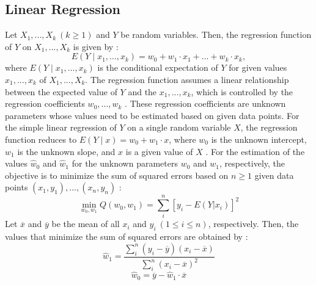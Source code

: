 \subsection{Linear Regression}
Let $X_1, ..., X_k \ (k \geq 1)$ and $Y$ be random variables. Then, the regression function of $Y$ on $X_1, ..., X_k$ is given by \cite{Standardization}:
\begin{equation}
E(Y \mid x_1, ..., x_k) = w_0 + w_1 \cdot x_1 + ... + w_k \cdot x_k,
\label{eq:regression_function}
\end{equation}
where $E(Y \mid x_1, ..., x_k)$ is the conditional expectation of $Y$ for given values $x_1, ..., x_k$ of $X_1, ..., X_k$. The regression function assumes a linear relationship between the expected value of $Y$ and the $x_1, ..., x_k$, which is controlled by the regression coefficients $w_0, ..., w_k$ \cite{Standardization}. These regression coefficients are unknown parameters whose values need to be estimated based on given data points. \newline
For the simple linear regression of $Y$ on a single random variable $X$, the regression function reduces to $E(Y \mid x) = w_0 + w_1 \cdot x$, where $w_0$ is the unknown intercept, $w_1$ is the unknown slope, and $x$ is a given value of $X$ \cite{Standardization}. For the estimation of the values $\hat{w}_0$ and $\hat{w}_1$ for the unknown parameters $w_0$ and $w_1$, respectively, the objective is to minimize the sum of squared errors based on $n \geq 1$ given data points $(x_1,y_1), ..., (x_n,y_n)$ \cite{Standardization}:
\begin{equation}
\min\limits_{w_0, w_1} Q(w_0,w_1) = \sum_{i}^{n}[y_i - E(Y|x_i)]^2
\label{eq:sum_of_squares_regression}
\end{equation}
Let $\overline{x}$ and $\overline{y}$ be the mean of all $x_i$ and $y_i \ (1 \leq i \leq n)$, respectively. Then, the values that minimize the sum of squared errors are obtained by \cite{Standardization}:
\begin{equation}
\hat{w}_1 = \frac{\sum_{i}^{n}(y_i - \overline{y})(x_i - \overline{x})}{\sum_{i}^{n}(x_i - \overline{x})^2}
\label{eq:ols_parameters_one}
\end{equation}
\begin{equation}
\hat{w}_0 = \overline{y} - \hat{w}_1 \cdot \overline{x}
\label{eq:ols_parameters_zero}
\end{equation}